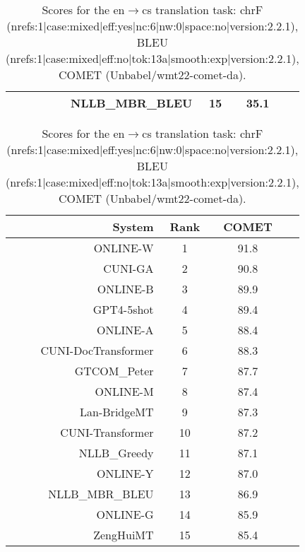 \documentclass[11pt]{article}
\begin{document}
\begin{table}
\begin{subtable}[t]{0.33\textwidth}
\begin{tabular}{rccc}
NLLB\_MBR\_BLEU & 15 & 35.1 \\ 
\bottomrule 
\end{tabular} 
\end{subtable} 
\begin{subtable}[t]{0.33\textwidth}
\begin{tabular}{rccc}
\toprule 
System & Rank & COMET \\ 
\midrule 
ONLINE-W & 1 & 91.8 \\ 
CUNI-GA & 2 & 90.8 \\ 
ONLINE-B & 3 & 89.9 \\ 
GPT4-5shot & 4 & 89.4 \\ 
ONLINE-A & 5 & 88.4 \\ 
CUNI-DocTransformer & 6 & 88.3 \\ 
GTCOM\_Peter & 7 & 87.7 \\ 
ONLINE-M & 8 & 87.4 \\ 
Lan-BridgeMT & 9 & 87.3 \\ 
CUNI-Transformer & 10 & 87.2 \\ 
NLLB\_Greedy & 11 & 87.1 \\ 
ONLINE-Y & 12 & 87.0 \\ 
NLLB\_MBR\_BLEU & 13 & 86.9 \\ 
ONLINE-G & 14 & 85.9 \\ 
ZengHuiMT & 15 & 85.4 \\ 
\bottomrule 
\end{tabular} 
\end{subtable} 
\caption{Scores for the en$\rightarrow$cs translation task: chrF (nrefs:1|case:mixed|eff:yes|nc:6|nw:0|space:no|version:2.2.1), BLEU (nrefs:1|case:mixed|eff:no|tok:13a|smooth:exp|version:2.2.1), COMET (Unbabel/wmt22-comet-da).} 
\end{table} 
\end{document}
